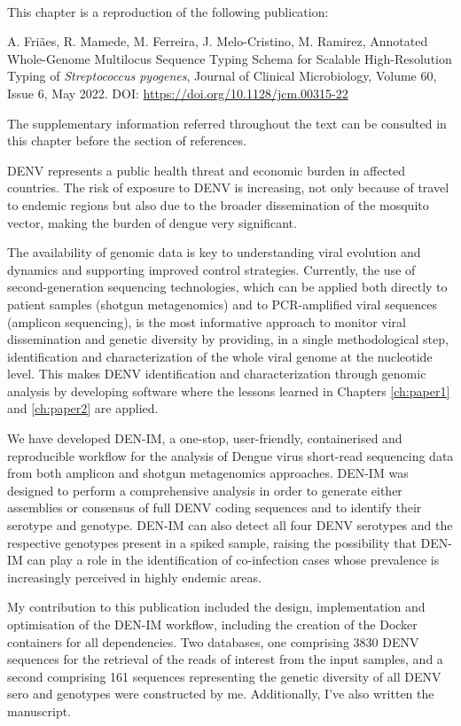 \mbox{}\\
\vspace{8cm}

This chapter is a reproduction of the following publication:

A. Friães, R. Mamede, M. Ferreira, J. Melo-Cristino, M. Ramirez, Annotated Whole-Genome Multilocus Sequence Typing Schema for Scalable High-Resolution Typing of \textit{Streptococcus pyogenes}, Journal of Clinical Microbiology, Volume 60, Issue 6, May 2022. DOI: \url{https://doi.org/10.1128/jcm.00315-22}

The supplementary information referred throughout the text can be consulted in this chapter before the section of references. 

DENV represents a public health threat and economic burden in affected countries. The risk of exposure to DENV is increasing, not only because of travel to endemic regions but also due to the broader dissemination of the mosquito vector, making the burden of dengue very significant. 

The availability of genomic data is key to understanding viral evolution and dynamics and supporting improved control strategies. Currently, the use of second-generation sequencing technologies, which can be applied both directly to patient samples (shotgun metagenomics) and to PCR-amplified viral sequences (amplicon sequencing), is the most informative approach to monitor viral dissemination and genetic diversity by providing, in a single methodological step, identification and characterization of the whole viral genome at the nucleotide level. This makes DENV identification and characterization through genomic analysis by developing software where the lessons learned in Chapters \ref{ch:paper1} and \ref{ch:paper2} are applied.

We have developed DEN-IM, a one-stop, user-friendly, containerised and reproducible workflow for the analysis of Dengue virus short-read sequencing data from both amplicon and shotgun metagenomics approaches. DEN-IM was designed to perform a comprehensive analysis in order to generate either assemblies or consensus of full DENV coding sequences and to identify their serotype and genotype. DEN-IM can also detect all four DENV serotypes and the respective genotypes present in a spiked sample, raising the possibility that DEN-IM can play a role in the identification of co-infection cases whose prevalence is increasingly perceived in highly endemic areas. 

My contribution to this publication included the design, implementation and optimisation of the DEN-IM workflow, including the creation of  the Docker containers for all dependencies. Two databases, one comprising 3830 DENV sequences for the retrieval of the reads of interest from the input samples, and a second comprising 161 sequences representing the genetic diversity of all DENV sero and genotypes were constructed by me.  Additionally, I've also written the manuscript.

